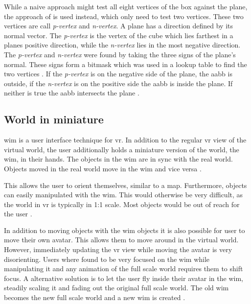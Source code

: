 While a naive approach might test all eight vertices of the box against the plane, the approach of \textcite{greene:1994:detecting} is used instead, which only need to test two vertices. These two vertices are call  \textit{p-vertex} and \textit{n-vertex}. A plane has a direction defined by its normal vector. The \textit{p-vertex} is the vertex of the cube which lies farthest in a planes positive direction, while the \textit{n-vertex} lies in the most negative direction. The \textit{p-vertex} and \textit{n-vertex} were found by taking the three signs of the plane's normal. These signs form a bitmask which was used in a lookup table to find the two vertices \cite{assarsson:2000:optimized}. If the \textit{p-vertex} is on the negative side of the plane, the \gls{aabb} is outside, if the \textit{n-vertex} is on the positive side the \gls{aabb} is inside the plane. If neither is true the \gls{aabb} intersects the plane \cite{greene:1994:detecting}.


\subsection{World in miniature}
\Gls{wim} is a user interface technique for \gls{vr}. In addition to the regular \gls{vr} view of the virtual world, the user additionally holds a miniature version of the world, the \gls{wim}, in their hands. The objects in the \gls{wim} are in sync with the real world. Objects moved in the real world move in the  \gls{wim} and vice versa \cite{stoakley:1995:virtual}. 

This allows the user to orient themselves, similar to a map. Furthermore, objects can easily manipulated with the \gls{wim}. This would otherwise be very difficult, as the world in \gls{vr} is typically in 1:1 scale. Most objects would be out of reach for the user \cite{stoakley:1995:virtual}.

In addition to moving objects with  the \gls{wim} objects it is also possible for user to move their own avatar. This allows them to move around in the virtual world. However, immediately updating the \gls{vr} view while moving the avatar is very disorienting. Users where found to be very focused on the \gls{wim} while manipulating it and any animation of the full scale world requires them to shift focus. A alternative solution is to let the user fly inside their avatar in the \gls{wim}, steadily scaling it and fading out the original full scale world. The old \gls{wim} becomes the new full scale world and a new \gls{wim} is created \cite{pausch:1995:navigation}.


